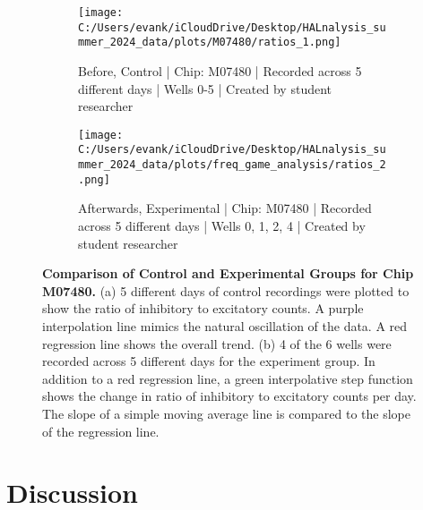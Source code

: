 \documentclass{article} %
\begin{document}
\begin{figure}
    \centering
    \hfill
    \begin{subfigure}[b]{0.48\textwidth}
        \centering
        \texttt{[image: C:/Users/evank/iCloudDrive/Desktop/HALnalysis\_summer\_2024\_data/plots/M07480/ratios\_1.png]}
        \caption{Before, Control | Chip: M07480 | Recorded across 5 different days | Wells 0-5 | Created by student researcher}
    \end{subfigure}
    \hspace{\fill}
    \begin{subfigure}[b]{0.48\textwidth}
        \centering
        \texttt{[image: C:/Users/evank/iCloudDrive/Desktop/HALnalysis\_summer\_2024\_data/plots/freq\_game\_analysis/ratios\_2.png]}
        \caption{Afterwards, Experimental | Chip: M07480 | Recorded across 5 different days | Wells 0, 1, 2, 4 | Created by student researcher}
    \end{subfigure}
    \caption{\textbf{Comparison of Control and Experimental Groups for Chip M07480.} (a) 5 different days of control recordings were plotted to show the ratio of inhibitory to excitatory counts. A purple interpolation line mimics the natural oscillation of the data. A red regression line shows the overall trend. (b) 4 of the 6 wells were recorded across 5 different days for the experiment group. In addition to a red regression line, a green interpolative step function shows the change in ratio of inhibitory to excitatory counts per day. The slope of a simple moving average line is compared to the slope of the regression line.}
\end{figure}




\section{Discussion}
\end{document}
